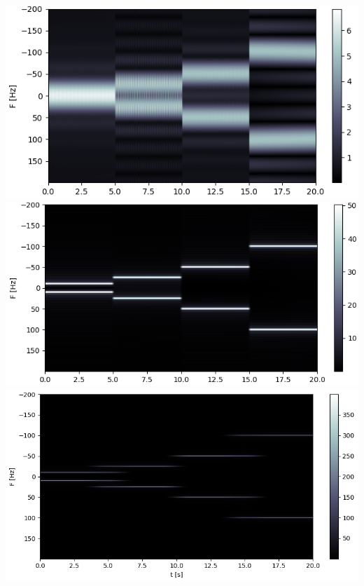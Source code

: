 \begin{listing}[ht]
    \noindent
    \begin{minipage}{0.51\textwidth}
        \strut\vspace*{-\baselineskip}\newline
        \inputminted[firstline=5, lastline=30]{python3}{code/stft_length.py}
    \end{minipage}%
    \begin{minipage}{0.48\textwidth}
        \strut\vspace*{-\baselineskip}\newline
        \includegraphics[width=\textwidth]{code/stft_length_1.png}\\
        \includegraphics[width=\textwidth]{code/stft_length_2.png}\\
        \includegraphics[width=\textwidth]{code/stft_length_3.png}
    \end{minipage}
    \label{py:stft_length}
\end{listing}
%
\clearpage

